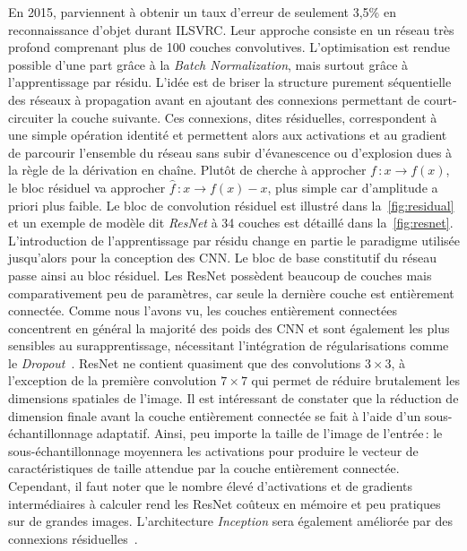 En 2015, \citet{he_deep_2016} parviennent à obtenir un taux d'erreur de seulement 3,5\% en reconnaissance d'objet durant \gls{ILSVRC}. Leur approche consiste en un réseau très profond comprenant plus de 100 couches convolutives. L'optimisation est rendue possible d'une part grâce à la \emph{Batch Normalization}, mais surtout grâce à l'apprentissage par résidu. L'idée est de briser la structure purement séquentielle des réseaux à propagation avant en ajoutant des connexions permettant de court-circuiter la couche suivante. Ces connexions, dites résiduelles, correspondent à une simple opération identité et permettent alors aux activations et au gradient de parcourir l'ensemble du réseau sans subir d’évanescence ou d'explosion dues à la règle de la dérivation en chaîne. Plutôt de cherche à approcher $f\,: x \rightarrow f(x)$, le bloc résiduel va approcher $\hat{f}\,: x \rightarrow f(x) - x$, plus simple car d'amplitude a priori plus faible. Le bloc de convolution résiduel est illustré dans la~\cref{fig:residual} et un exemple de modèle dit \emph{ResNet} à 34 couches est détaillé dans la~\cref{fig:resnet}. L'introduction de l'apprentissage par résidu change en partie le paradigme utilisée jusqu'alors pour la conception des \gls{CNN}. Le bloc de base constitutif du réseau passe ainsi au bloc résiduel.
Les ResNet possèdent beaucoup de couches mais comparativement peu de paramètres, car seule la dernière couche est entièrement connectée. Comme nous l'avons vu, les couches entièrement connectées concentrent en général la majorité des poids des \gls{CNN} et sont également les plus sensibles au surapprentissage, nécessitant l'intégration de régularisations comme le \emph{Dropout}~\cite{srivastava_dropout_2014}. ResNet ne contient quasiment que des convolutions $3\times3$, à l'exception de la première convolution $7\times7$ qui permet de réduire brutalement les dimensions spatiales de l'image. Il est intéressant de constater que la réduction de dimension finale avant la couche entièrement connectée se fait à l'aide d'un sous-échantillonnage adaptatif. Ainsi, peu importe la taille de l'image de l'entrée\,: le sous-échantillonnage moyennera les activations pour produire le vecteur de caractéristiques de taille attendue par la couche entièrement connectée. Cependant, il faut noter que le nombre élevé d'activations et de gradients intermédiaires à calculer rend les ResNet coûteux en mémoire et peu pratiques sur de grandes images. L'architecture \emph{Inception} sera également améliorée par des connexions résiduelles~\cite{szegedy_inception-v4_2017}.


